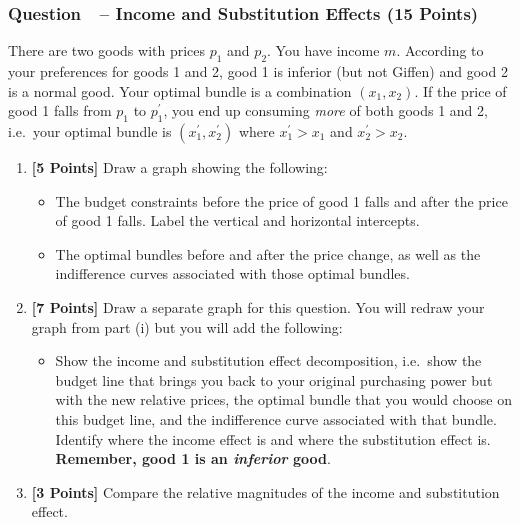 \documentclass[10pt]{article}
\newcounter{question}[section]
\newcommand{\question}[1]{\refstepcounter{question}
  \subsubsection*{Question~\thequestion~-- #1}}
\newenvironment{subquestions}{
  \begin{enumerate}[label=(\roman*)]}{\end{enumerate}}
\begin{document}
\question{Income and Substitution Effects (15 Points)}
There are two goods with prices $p_1$ and $p_2$. You have income $m$. According to your preferences for goods 1 and 2, good 1 is inferior (but not Giffen) and good 2 is a normal good. Your optimal bundle is a combination $\left( x_1,x_2 \right)$. If the price of good 1 falls from $p_1$ to $p_1^\prime$, you end up consuming \emph{more} of both goods 1 and 2, i.e.~your optimal bundle is $\left( x_1^\prime,x_2^\prime \right)$ where $x_1^\prime>x_1$ and $x_2^\prime>x_2$.
\begin{subquestions}
  \item \textbf{[5 Points]} Draw a graph showing the following:
    \begin{itemize}
      \item The budget constraints before the price of good 1 falls and after the price of good 1 falls. Label the vertical and horizontal intercepts.
      \item The optimal bundles before and after the price change, as well as the indifference curves associated with those optimal bundles.
    \end{itemize}
  \item \textbf{[7 Points]} Draw a separate graph for this question. You will redraw your graph from part (i) but you will add the following:
    \begin{itemize}
      \item Show the income and substitution effect decomposition, i.e.~show the budget line that brings you back to your original purchasing power but with the new relative prices, the optimal bundle that you would choose on this budget line, and the indifference curve associated with that bundle. Identify where the income effect is and where the substitution effect is. \textbf{Remember, good 1 is an \emph{inferior} good}.
    \end{itemize}
  \item \textbf{[3 Points]} Compare the relative magnitudes of the income and substitution effect.
\end{subquestions}
\end{document}
